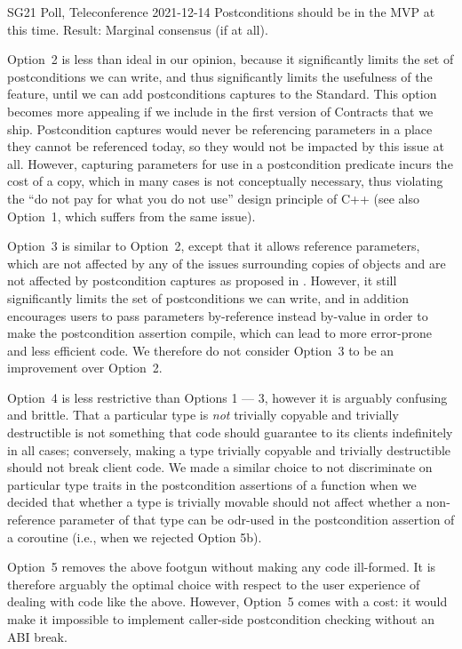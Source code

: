 \begin{wgpoll}{SG21 Poll, Teleconference 2021-12-14}
Postconditions should be in the MVP at this time.
Result: Marginal consensus (if at all).
\end{wgpoll}

Option~2 is less than ideal in our opinion, because it significantly limits the set of postconditions we can write, and thus significantly limits the usefulness of the feature, until we can add postconditions captures \cite{P3098R0} to the Standard. This option becomes more appealing if we include \cite{P3098R0} in the first version of Contracts that we ship. Postcondition captures would never be referencing parameters in a place they cannot be referenced today, so they would not be impacted by this issue at all. However, capturing parameters for use in a postcondition predicate incurs the cost of a copy, which in many cases is not conceptually necessary, thus violating the ``do not pay for what you do not use'' design principle of C++ (see also \cite{D3484R1} Option~1, which suffers from the same issue).

Option~3 is similar to Option~2, except that it allows reference parameters, which are not affected by any of the issues surrounding copies of objects and are not affected by postcondition captures as proposed in \cite{P3098R0}. However, it still significantly limits the set of postconditions we can write, and in addition encourages users to pass parameters by-reference instead by-value in order to make the postcondition assertion compile, which can lead to more error-prone and less efficient code. We therefore do not consider Option~3 to be an improvement over Option~2.

Option~4 is less restrictive than Options 1 --- 3, however it is arguably confusing and brittle. That a particular type is \emph{not} trivially copyable and trivially destructible is not something that code should guarantee to its clients indefinitely in all cases; conversely, making a type trivially copyable and trivially destructible should not break client code. We made a similar choice to not discriminate on particular type traits in the postcondition assertions of a function when we decided that whether a type is trivially movable should not affect whether a non-reference parameter of that type can be odr-used in the postcondition assertion of a coroutine (i.e., when we rejected \cite{P3387R0} Option 5b).

Option~5 removes the above footgun without making any code ill-formed. It is therefore arguably the optimal choice with respect to the user experience of dealing with code like the above. However, Option~5 comes with a cost: it would make it impossible to implement caller-side postcondition checking without an ABI break.

